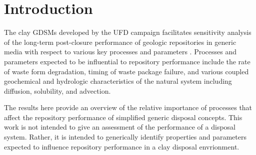 
\section{Introduction}

The clay \gls{GDSM}s developed by the \gls{UFD} campaign facilitates sensitivity 
analysis of the long-term post-closure performance of geologic repositories in 
generic media with respect to various key processes and parameters 
\cite{clayton_generic_2011}. Processes and parameters expected to be influential 
to repository performance  include the rate of waste form degradation, timing of 
waste package failure, and various coupled geochemical and hydrologic 
characteristics of the natural system including diffusion, solubility, and 
advection.

The results here provide an overview of the relative importance of processes 
that affect the repository performance of simplified generic disposal 
concepts. This work is not intended to give an assessment of the performance of a 
disposal system. Rather, it is intended to  generically identify properties and 
parameters expected to influence repository performance in a clay disposal 
envrionment.
